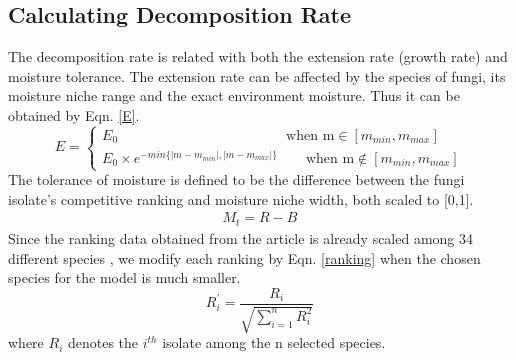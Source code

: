 \documentclass[a4paper,12pt]{article}
\begin{document}
\subsection{Calculating Decomposition Rate}
The decomposition rate is related with both the extension rate (growth rate) and moisture tolerance. The extension rate can be affected by the species of fungi, its moisture niche range and the exact environment moisture. Thus it can be obtained by Eqn. \ref{E}.
\begin{equation}\label{E}
E=\left\{ \begin{array}{c}
E_0 \qquad \qquad \qquad \qquad  \qquad \qquad  \text{when m} \in  [m_{min},m_{max}] \\
E_0 \times e^{- min\{|m-m_{min}|,|m-m_{max}|\} } \qquad \text{when m} \notin  [m_{min},m_{max}] 
\end{array} \right.
\end{equation}
The tolerance of moisture is defined to be the difference between the fungi isolate's competitive ranking and moisture niche width, both scaled to [0,1]. 
\begin{align*}
M_t=R-B 
\end{align*}
Since the ranking data obtained from the article is already scaled among 34 different species \cite{CompArticle}, we modify each ranking by Eqn. \ref{ranking} when the chosen species for the model is much smaller.
\begin{equation}\label{ranking}
R^{'}_i= \dfrac{R_i}{\sqrt{\sum_{i=1}^n R_i^2}}
\end{equation} where $R_i$ denotes the $i^{th}$ isolate among the n selected species.
\end{document}
